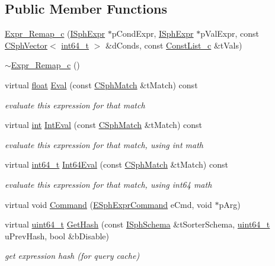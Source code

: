 \subsection*{Public Member Functions}
\begin{DoxyCompactItemize}
\item 
\hyperlink{classExpr__Remap__c_a45fd6129a3e4b3ecfe2cfbf0e72b736b}{Expr\-\_\-\-Remap\-\_\-c} (\hyperlink{structISphExpr}{I\-Sph\-Expr} $\ast$p\-Cond\-Expr, \hyperlink{structISphExpr}{I\-Sph\-Expr} $\ast$p\-Val\-Expr, const \hyperlink{classCSphVector}{C\-Sph\-Vector}$<$ \hyperlink{sphinxstd_8h_a996e72f71b11a5bb8b3b7b6936b1516d}{int64\-\_\-t} $>$ \&d\-Conds, const \hyperlink{classConstList__c}{Const\-List\-\_\-c} \&t\-Vals)
\item 
\hyperlink{classExpr__Remap__c_a8dcb829e612e2d07bf85c96002ec7b22}{$\sim$\-Expr\-\_\-\-Remap\-\_\-c} ()
\item 
virtual \hyperlink{sphinxexpr_8cpp_a0e0d0739f7035f18f949c2db2c6759ec}{float} \hyperlink{classExpr__Remap__c_a56ecba4c4b628216c18772ac6204d5c5}{Eval} (const \hyperlink{classCSphMatch}{C\-Sph\-Match} \&t\-Match) const 
\begin{DoxyCompactList}\small\item\em evaluate this expression for that match \end{DoxyCompactList}\item 
virtual \hyperlink{sphinxexpr_8cpp_a4a26e8f9cb8b736e0c4cbf4d16de985e}{int} \hyperlink{classExpr__Remap__c_a68743a43786245b0b3be5e169ed5325e}{Int\-Eval} (const \hyperlink{classCSphMatch}{C\-Sph\-Match} \&t\-Match) const 
\begin{DoxyCompactList}\small\item\em evaluate this expression for that match, using int math \end{DoxyCompactList}\item 
virtual \hyperlink{sphinxstd_8h_a996e72f71b11a5bb8b3b7b6936b1516d}{int64\-\_\-t} \hyperlink{classExpr__Remap__c_ad34d2a824046ec539045cf72c2cdba9c}{Int64\-Eval} (const \hyperlink{classCSphMatch}{C\-Sph\-Match} \&t\-Match) const 
\begin{DoxyCompactList}\small\item\em evaluate this expression for that match, using int64 math \end{DoxyCompactList}\item 
virtual void \hyperlink{classExpr__Remap__c_abdf9ee82c851952064af5113d01ee18f}{Command} (\hyperlink{sphinxexpr_8h_a30be184fb07bd80c271360fc6094c818}{E\-Sph\-Expr\-Command} e\-Cmd, void $\ast$p\-Arg)
\item 
virtual \hyperlink{sphinxstd_8h_aaa5d1cd013383c889537491c3cfd9aad}{uint64\-\_\-t} \hyperlink{classExpr__Remap__c_a7de69a6ceff60fa1681442f451f0bf2a}{Get\-Hash} (const \hyperlink{classISphSchema}{I\-Sph\-Schema} \&t\-Sorter\-Schema, \hyperlink{sphinxstd_8h_aaa5d1cd013383c889537491c3cfd9aad}{uint64\-\_\-t} u\-Prev\-Hash, bool \&b\-Disable)
\begin{DoxyCompactList}\small\item\em get expression hash (for query cache) \end{DoxyCompactList}\end{DoxyCompactItemize}
